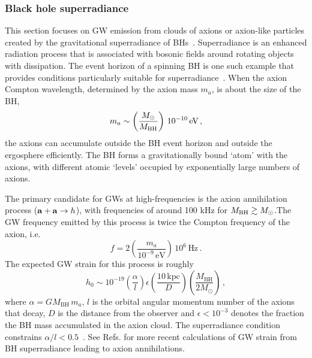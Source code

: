 \documentclass[11pt,a4paper]{article}
\begin{document}
\subsubsection{Black hole superradiance}
\label{sec:Superradiance}

This section focuses on GW emission from clouds of axions or axion-like particles created by the gravitational superradiance of BHs~\cite{Ternov:1978gq,Zouros:1979iw,Arvanitaki:2009fg,Arvanitaki:2010sy,arvanitaki:2016gw,aggarwal2020searching,Detweiler:1980uk,Yoshino:2013ofa,Arvanitaki:2014wva,Brito:2014wla,Brito:2015oca}.
Superradiance is an enhanced radiation process that is associated with bosonic fields around rotating objects with dissipation. The event horizon of a spinning BH is one such example that provides conditions particularly suitable for superradiance~\cite{Arvanitaki:2014wva}.
When the axion Compton wavelength, determined by the axion mass $m_a$, is about the size of the BH,
\begin{equation}
\label{eq:maMBH}
m_a \sim \left( \frac{ M_\odot}{M_{\rm BH} } \right) \, 10^{-10}\, \text{eV} \,,
\end{equation}
the axions can accumulate outside the BH event horizon and outside the ergosphere efficiently. 
The BH forms a gravitationally bound `atom' with the axions, with different atomic `levels' occupied by exponentially large numbers of axions.

The primary candidate for GWs at high-frequencies is the axion annihilation  process (${\bf a}  +  {\bf a} \rightarrow h$), with frequencies of around 100 kHz for $M_{\rm BH} \gtrsim M_\odot$.The GW frequency emitted by this process is twice the Compton frequency of the axion, i.e.
\begin{equation}
\label{eq:fsprannihilation}
f = 2 \left( \frac{m_a}{10^{-9} \, \text{eV}} \right) \, 10^{6} \, \text{Hz} \,.
\end{equation}
 The expected GW strain for this process is roughly \cite{arvanitaki:2016gw} 
\begin{equation}
    h_0 \sim 10^{-19}\left(\frac{\alpha}{l}\right)\epsilon \left(\frac{10 \, \mathrm{kpc}}{D}\right)\left(\frac{M_\mathrm{BH}}{2 M_\odot}\right) \,,
\label{eq:strain_axion_annihilation}
\end{equation}
where $\alpha = G M_\mathrm{BH} \, m_a$, $l$ is the orbital angular momentum number of the axions that decay, $D$ is the distance from the observer and $\epsilon < 10^{-3}$ denotes the fraction the BH mass accumulated in the axion cloud. {The superradiance condition constrains $\alpha/l < 0.5$~\cite{Arvanitaki:2010sy}.} See Refs. \cite{Brito:2014wla,aggarwal2020searching} for more recent calculations of GW strain from BH superradiance leading to axion annihilations.
\end{document}
